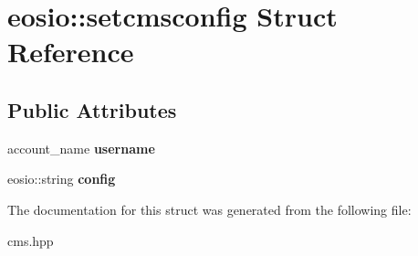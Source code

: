 \hypertarget{structeosio_1_1setcmsconfig}{}\section{eosio\+:\+:setcmsconfig Struct Reference}
\label{structeosio_1_1setcmsconfig}
\subsection*{Public Attributes}
\begin{DoxyCompactItemize}
\item 
\mbox{\label{structeosio_1_1setcmsconfig_addca2838e563fb39cd528a0ccf99fc44}} 
account\+\_\+name {\bfseries username}
\item 
\mbox{\label{structeosio_1_1setcmsconfig_a7037255917c0aa34ca92309e03287bab}} 
eosio\+::string {\bfseries config}
\end{DoxyCompactItemize}


The documentation for this struct was generated from the following file\+:\begin{DoxyCompactItemize}
\item 
cms.\+hpp\end{DoxyCompactItemize}

